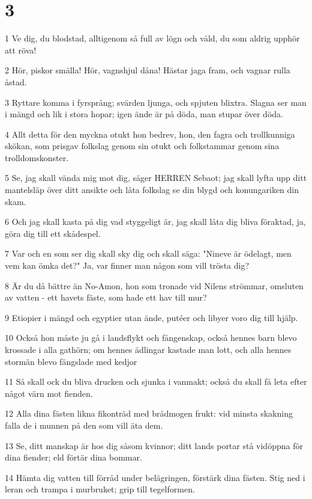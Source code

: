 \chapter{3}

\par 1 Ve dig, du blodstad, alltigenom så full av lögn och våld, du som aldrig upphör att röva!
\par 2 Hör, piskor smälla! Hör, vagnshjul dåna! Hästar jaga fram, och vagnar rulla åstad.
\par 3 Ryttare komma i fyrsprång; svärden ljunga, och spjuten blixtra. Slagna ser man i mängd och lik i stora hopar; igen ände är på döda, man stupar över döda.
\par 4 Allt detta för den myckna otukt hon bedrev, hon, den fagra och trollkunniga skökan, som prisgav folkslag genom sin otukt och folkstammar genom sina trolldomskonster.
\par 5 Se, jag skall vända mig mot dig, säger HERREN Sebaot; jag skall lyfta upp ditt mantelsläp över ditt ansikte och låta folkslag se din blygd och konungariken din skam.
\par 6 Och jag skall kasta på dig vad styggeligt är, jag skall låta dig bliva föraktad, ja, göra dig till ett skådespel.
\par 7 Var och en som ser dig skall sky dig och skall säga: "Nineve är ödelagt, men vem kan ömka det?" Ja, var finner man någon som vill trösta dig?
\par 8 Är du då bättre än No-Amon, hon som tronade vid Nilens strömmar, omsluten av vatten - ett havets fäste, som hade ett hav till mur?
\par 9 Etiopier i mängd och egyptier utan ände, putéer och libyer voro dig till hjälp.
\par 10 Också hon måste ju gå i landsflykt och fångenskap, också hennes barn blevo krossade i alla gathörn; om hennes ädlingar kastade man lott, och alla hennes stormän blevo fängslade med kedjor
\par 11 Så skall ock du bliva drucken och sjunka i vanmakt; också du skall få leta efter något värn mot fienden.
\par 12 Alla dina fästen likna fikonträd med brådmogen frukt: vid minsta skakning falla de i munnen på den som vill äta dem.
\par 13 Se, ditt manskap är hos dig såsom kvinnor; ditt lands portar stå vidöppna för dina fiender; eld förtär dina bommar.
\par 14 Hämta dig vatten till förråd under belägringen, förstärk dina fästen. Stig ned i leran och trampa i murbruket; grip till tegelformen.
